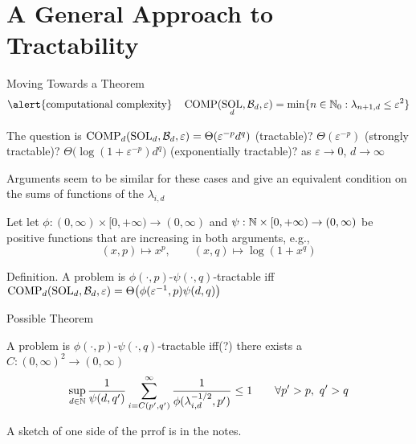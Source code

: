 \documentclass[11pt,compress,xcolor={usenames,dvipsnames},aspectratio=169]{beamer}
\DeclareMathOperator{\COMP}{COMP}
\DeclareMathOperator{\SOL}{SOL}
\begin{document}
\section{A General Approach to Tractability}
\begin{frame}{Moving Towards a Theorem}
    \vspace{-6ex}
    \[
    \text{\alert{computational complexity}\quad} \COMP(\SOL_d,\cb_d,\varepsilon) = \min \{n \in \natzero : \lambda_{n+1, d} \le \varepsilon^2\} 
    \]
    
    \vspace{-3ex}
   The question is $\COMP_d(\SOL_d,\cb_d,\varepsilon) = \Theta(\varepsilon^{-p} d^q)$ (tractable)? $\Theta(\varepsilon^{-p})$ (strongly tractable)? $\Theta\bigl(\log(1 + \varepsilon^{-p} ) d^q \bigr)$ (exponentially  tractable)?
   \hfill \hfill as $\varepsilon \to 0$, $d \to \infty$
   
   Arguments seem to be similar for these cases and give an equivalent condition on the sums of functions of the $\lambda_{i,d}$
 
   Let let $\phi : (0,\infty) \times [0,+\infty) \to (0,\infty)$ and $\psi : \mathbb{N}  \times [0,+\infty) \to (0,\infty)$ be positive functions that are increasing in both arguments, e.g., 
\[
(x,p) \mapsto x^{p}, \qquad (x,q) \mapsto \log(1+ x^q)
\]

\vspace{-3ex}
\alert{Definition.} A problem is $\phi(\cdot,p)$-$\psi(\cdot, q)$-tractable iff $\COMP_d(\SOL_d,\cb_d,\varepsilon) = \Theta\bigl(\phi(\varepsilon^{-1},p) \psi(d,q)  \bigr)$



\end{frame}

\begin{frame}{Possible Theorem}
\begin{theorem} A problem is $\phi(\cdot,p)$-$\psi(\cdot, q)$-tractable iff(?) there exists a  $C : (0,\infty)^2 \to (0,\infty)$
\begin{equation*}
    \sup_{d \in \mathbb{N}} \frac{1}{\psi(d,q')} \sum_{i = C(p',q')}^\infty \frac{1}{\phi(\lambda_{i, d}^{-1/2},p')} \le 1 \qquad \forall p' > p, \ q' > q
\end{equation*}
\end{theorem}

A sketch of one side of the prrof is in the notes.
\end{frame}
\end{document}
